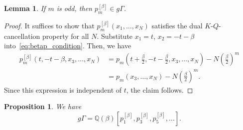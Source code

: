 \documentclass[dvipdfmx]{amsart}
\newtheorem{lemma}[thm]{Lemma}
\newtheorem{prop}[thm]{Proposition}
\theoremstyle{definition}
\theoremstyle{remark}
\begin{document}
\begin{lemma}
If \( m \) is odd, then \( p_m^{[\beta]} \in g\Gamma \).
\end{lemma}

\begin{proof}
It suffices to show that \( p_m^{[\beta]}(x_1, \dots, x_N) \) satisfies the dual \( K \)-\( Q \)-cancellation property for all \( N \).  
Substitute \( x_1 = t \), \( x_2 = -t - \beta \) into~\eqref{eq:betap_condition}. Then, we have
\[
\begin{aligned}
p_m^{[\beta]}(t, -t - \beta, x_3, \dots, x_N) 
&= p_m(t + \tfrac{\beta}{2}, -t - \tfrac{\beta}{2}, x_3, \dots, x_N) - N\left( \tfrac{\beta}{2} \right)^m \\
&= p_m(x_3, \dots, x_N) - N\left( \tfrac{\beta}{2} \right)^m.
\end{aligned}
\]
Since this expression is independent of \( t \), the claim follows.
\end{proof}

\begin{prop}\label{prop:p_isbasis_ofg}
We have
\[
g\Gamma = \mathbb{Q}(\beta)[p_1^{[\beta]}, p_3^{[\beta]}, p_5^{[\beta]}, \dots].
\]
\end{prop}
\end{document}
